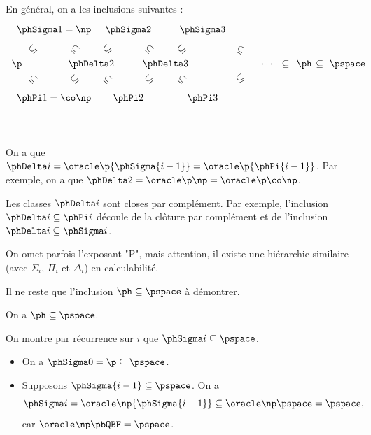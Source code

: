 \documentclass[./main]{subfiles}
\begin{document}
  En général, on a les inclusions suivantes :
  \[
  \begin{tikzcd}[column sep={38,between origins}, row sep={35, between origins}]
    & \phSigma 1 \arrow[marking,phantom]{dr}{\subseteq} = \np && \phSigma 2 \arrow[marking,phantom]{dr}{\subseteq} && \phSigma 3\arrow[marking,phantom]{dr}{\subseteq}\\
    \mathclap{\p} \arrow[marking,phantom]{ur}{\subseteq} \arrow[marking,phantom]{dr}{\subseteq} && \mathclap{\phDelta 2} \arrow[marking,phantom]{ur}{\subseteq} \arrow[marking,phantom]{dr}{\subseteq} && \mathclap{\phDelta 3} \arrow[marking,phantom]{ur}{\subseteq} \arrow[marking,phantom]{dr}{\subseteq} && \mathclap{\cdots} \arrow[marking,phantom]{r}{\subseteq} &\mathclap{\ph} \arrow[marking,phantom]{r}{\subseteq}& \quad\;\mathclap{\pspace}\\
    & \phPi 1 \arrow[marking,phantom]{ur}{\subseteq} = \conp && \phPi 2 \arrow[marking,phantom]{ur}{\subseteq} && \phPi 3 \arrow[marking,phantom]{ur}{\subseteq}\\
  \end{tikzcd}
  \]

  \begin{rmk}
    On a que $\phDelta i = \oracle\p{\phSigma {i-1}} = \oracle\p{\phPi {i-1}}$.
    Par exemple, on a que $\phDelta 2 = \oracle \p \np = \oracle \p \conp$.

    Les classes $\phDelta i$ sont closes par complément. Par exemple, l'inclusion $\phDelta i \subseteq \phPi i$ découle de la clôture par complément et de l'inclusion $\phDelta i \subseteq \phSigma i$.

    On omet parfois l'exposant "$\mathrm{P}$", mais attention, il existe une hiérarchie similaire (avec $\Sigma_i$, $\Pi_i$ et $\Delta_i$) en calculabilité.
  \end{rmk}

  Il ne reste que l'inclusion $\ph \subseteq \pspace$ à démontrer.

  \begin{prop}
    On a $\ph \subseteq \pspace$.
  \end{prop}
  \begin{prv}
    On montre par récurrence sur $i$ que $\phSigma i \subseteq \pspace$.
    \begin{itemize}
      \item On a $\phSigma 0 = \p \subseteq \pspace$.
      \item Supposons $\phSigma {i-1} \subseteq \pspace$.
        On a
        \[
          \phSigma i = \oracle \np {\phSigma {i-1}} \subseteq \oracle \np \pspace = \pspace
        ,\] 
        car $\oracle \np \pbQBF = \pspace$.
    \end{itemize}
  \end{prv}
\end{document}
